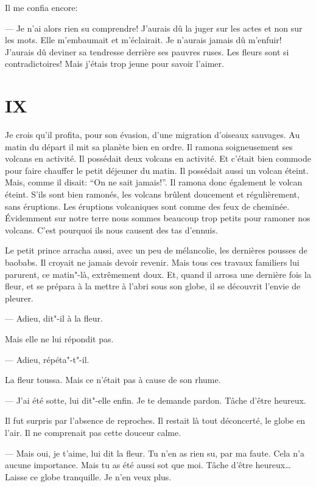 \begin{Parallel}[p]{}{}
{Il me confia encore:

--- Je n'ai alors rien su comprendre! J'aurais dû
la juger sur les actes et non sur
les mots. Elle m'embaumait et
m'éclairait. Je n'aurais jamais dû
m'enfuir! J'aurais dû deviner sa
tendresse derrière ses pauvres ruses. Les fleurs sont si contradictoires! Mais j'étais trop jeune
pour savoir l'aimer.

\section{IX}

Je crois qu'il profita, pour son évasion, d'une
migration d'oiseaux sauvages. Au matin du départ il
mit sa planète bien en ordre. Il ramona soigneusement ses volcans en activité. Il possédait deux volcans en activité.
Et c'était bien commode pour faire
chauffer le petit déjeuner du matin. Il possédait
aussi un volcan éteint. Mais, comme il disait: ``On
ne sait jamais!''. Il ramona donc également le volcan
éteint. S'ils sont bien ramonés, les volcans brûlent
doucement et régulièrement, sans éruptions. Les
éruptions volcaniques sont comme des feux de cheminée. Évidemment sur notre terre nous sommes
beaucoup trop petits pour ramoner nos volcans.
C'est pourquoi ils nous causent des tas d'ennuis.

Le petit prince arracha aussi, avec un peu de
mélancolie, les dernières pousses de baobabs. Il
croyait ne jamais devoir revenir. Mais tous ces travaux familiers lui parurent, ce matin"-là, extrêmement doux. Et, quand il arrosa une dernière fois la fleur, et se prépara à la mettre à l'abri sous son
globe, il se découvrit l'envie de pleurer.

--- Adieu, dit"-il à la fleur.

Mais elle ne lui répondit pas.

--- Adieu, répéta"-t"-il.

La fleur toussa. Mais ce n'était pas à cause de son rhume.

--- J'ai été sotte, lui dit"-elle enfin. Je te demande
pardon. Tâche d'être heureux.

Il fut surpris par l'absence de reproches. Il restait là tout déconcerté, le globe en l'air. Il ne comprenait pas cette douceur calme.

--- Mais oui, je t'aime, lui dit la fleur. Tu n'en as
rien su, par ma faute. Cela n'a aucune importance.
Mais tu as été aussi sot que moi. Tâche d'être heureux\ldots{} Laisse ce globe tranquille. Je n'en veux plus.

}
\end{Parallel}
